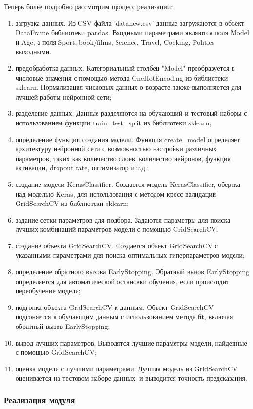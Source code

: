 Теперь более подробно рассмотрим процесс реализации:
\begin{enumerate}
    \item загрузка данных. Из CSV-файла 'datanew.csv' данные загружаются в объект DataFrame библиотеки pandas. Входными параметрами являются поля Model и Age, а поля Sport, book/films, Science, Travel, Cooking, Politics выходными.
    \item предобработка данных. Категориальный столбец "Model" преобразуется в числовые значения с помощью метода OneHotEncoding из библиотеки sklearn. Нормализация числовых данных о возрасте также выполняется для лучшей работы нейронной сети;
    \item разделение данных. Данные разделяются на обучающий и тестовый наборы с использованием функции train\_test\_split из библиотеки sklearn;
    \item определение функции создания модели. Функция create\_model определяет архитектуру нейронной сети с возможностью настройки различных параметров, таких как количество слоев, количество нейронов, функция активации, dropout rate, оптимизатор и т.д.;
    \item создание модели KerasClassifier. Создается модель KerasClassifier, обертка над моделью Keras, для использования с методом кросс-валидации GridSearchCV из библиотеки sklearn;
    \item задание сетки параметров для подбора. Задаются параметры для поиска лучших комбинаций параметров модели с помощью GridSearchCV;
    \item создание объекта GridSearchCV. Создается объект GridSearchCV с указанными параметрами для поиска оптимальных гиперпараметров модели;
    \item определение обратного вызова EarlyStopping. Обратный вызов EarlyStopping определяется для автоматической остановки обучения, если происходит переобучение модели;
    \item подгонка объекта GridSearchCV к данным. Объект GridSearchCV подгоняется к обучающим данным с использованием метода fit, включая обратный вызов EarlyStopping;
    \item вывод лучших параметров. Выводятся лучшие параметры модели, найденные с помощью GridSearchCV;
    \item оценка модели с лучшими параметрами. Лучшая модель из GridSearchCV оценивается на тестовом наборе данных, и выводится точность предсказания.
\end{enumerate}


\subsubsection{Реализация модуля}

